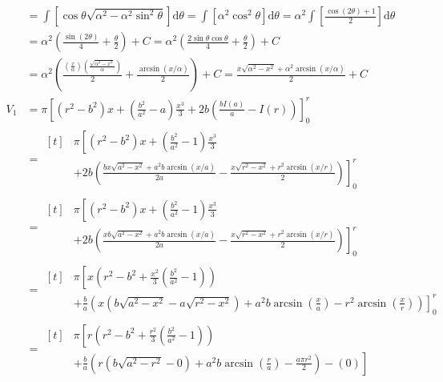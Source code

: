 \documentclass[12pt, A4]{report}
\renewcommand{\d}{\text{d}}
\begin{document}
\begin{enumerate}
\begin{enumerate}
\begin{align*}
									&= \int\left[\cos\theta\sqrt{\alpha^2 - \alpha^2\sin^2\theta}\right]\d\theta
										= \int\left[\alpha^2\cos^2\theta\right]\d\theta
										= \alpha^2\int\left[\frac{\cos(2\theta) + 1}{2}\right]\d\theta \\
									&= \alpha^2\left(\frac{\sin(2\theta)}{4} + \frac{\theta}{2}\right) + C
										= \alpha^2\left(\frac{2\sin\theta\cos\theta}{4} + \frac{\theta}{2}\right) + C \\
									&= \alpha^2\left(\frac{\left(\frac{x}{\alpha}\right)\left(\frac{\sqrt{\alpha^2 - x^2}}{\alpha}\right)}{2} + \frac{\arcsin(x/\alpha)}{2}\right) + C
										= \frac{x\sqrt{\alpha^2 - x^2} + \alpha^2\arcsin(x/\alpha)}{2} + C \\
									V_1 &= \pi\left[(r^2 - b^2)x + \left(\frac{b^2}{a^2} - a\right)\frac{x^3}{3} + 2b\left(\frac{bI(a)}{a} - I(r)\right)\right]_0^r \\
										&= \begin{aligned}[t] &\pi\left[(r^2 - b^2)x + \left(\frac{b^2}{a^2} - 1 \right)\frac{x^3}{3}\right. \\ 
											&\left.+ 2b\left(\frac{bx\sqrt{a^2 - x^2} + a^2b\arcsin(x/a)}{2a} - \frac{x\sqrt{r^2 - x^2} + r^2\arcsin(x/r)}{2}\right)\right]_0^r \end{aligned} \\
										&= \begin{aligned}[t] &\pi\left[(r^2 - b^2)x + \left(\frac{b^2}{a^2} - 1 \right)\frac{x^3}{3}\right. \\ 
											&\left.+ 2b\left(\frac{xb\sqrt{a^2 - x^2} + a^2b\arcsin(x/a)}{2a} - \frac{x\sqrt{r^2 - x^2} + r^2\arcsin(x/r)}{2}\right)\right]_0^r \end{aligned} \\
										&= \begin{aligned}[t]&\pi\left[x\left(r^2 - b^2 + \frac{x^2}{3}\left(\frac{b^2}{a^2} - 1\right)\right)\right. \\ 
											&\left.+ \frac{b}{a}\left(x\left(b\sqrt{a^2 - x^2} - a\sqrt{r^2 - x^2}\right) + a^2b\arcsin\left(\frac{x}{a}\right) - r^2\arcsin\left(\frac{x}{r}\right)\right)\right]_0^r\end{aligned} \\
										&= \begin{aligned}[t]&\pi\left[r\left(r^2 - b^2 + \frac{r^2}{3}\left(\frac{b^2}{a^2} - 1\right) \right)\right. \\ 
											&\left.+ \frac{b}{a}\left(r\left(b\sqrt{a^2 - r^2} - 0\right) + a^2b\arcsin\left(\frac{r}{a}\right) - \frac{a\pi r^2}{2}\right) - (0)\right]\end{aligned}\\

\end{align*}
\end{enumerate}
\end{enumerate}
\end{document}
